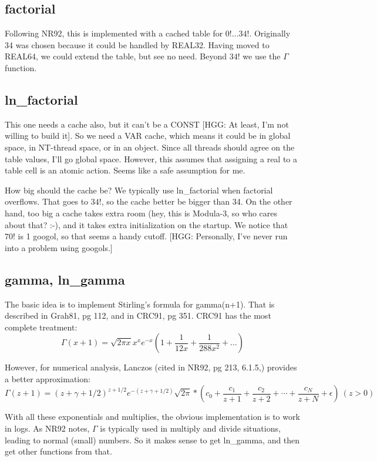 \subsection*{factorial}
Following NR92, this is implemented with a cached table for
$0! \dots 34!$.
Originally 34 was chosen because it could be handled by
REAL32.  Having moved to REAL64, we could extend the
table, but see no need.  Beyond $34!$ we use the $\Gamma$ function.

\subsection*{ln\_factorial}
This one needs a cache also, but it can't be a
CONST [HGG: At least, I'm not willing to build it].  So we need a VAR
cache, which means it could be in global space, in NT-thread
space, or in an object.  Since all threads should agree on
the table values, I'll go global space.  However, this
assumes that assigning a real to a table cell is an atomic
action.  Seems like a safe assumption for me.

How big should the cache be?  We typically use ln\_factorial when
factorial overflows.  That goes to $34!$, so the cache better be bigger
than 34.  On the
other hand, too big a cache takes extra room (hey, this is
Modula-3, so who cares about that? :-), and it takes extra
initialization on the startup.  We notice that $70!$ is 1
googol, so that seems a handy cutoff.  [HGG: Personally, I've
never run into a problem using googols.]


\subsection*{gamma, ln\_gamma}
The basic idea is to implement Stirling's formula for gamma(n+1).
That is described in Grah81, pg 112, and in
CRC91, pg 351.  CRC91 has the most complete treatment:
\begin{equation}
  \Gamma(x+1)=\sqrt{2\pi x}x^{x}e^{-x}(1+\frac{1}{12x}
    +\frac{1}{288x^2}+\dots)
\end{equation}

However, for numerical analysis, Lanczos (cited in NR92, pg 213, 6.1.5,)
provides a better approximation:
\begin{equation}
  \Gamma(z+1)=(z+ \gamma +1/2)^{z+1/2}e^{-(z+ \gamma +1/2)}
  \sqrt{2\pi}*(c_0+\frac{c_1}{z+1}+\frac{c_2}{z+2}
       +\cdots+\frac{c_N}{z+N}+\epsilon)\ (z>0)
\end{equation}

With all these exponentials and multiplies, the obvious implementation
is to work in logs.  As NR92 notes, $\Gamma$ is typically used
in multiply and divide situations, leading to normal (small) numbers.
So it makes sense to get ln\_gamma, and then get other functions from that.


